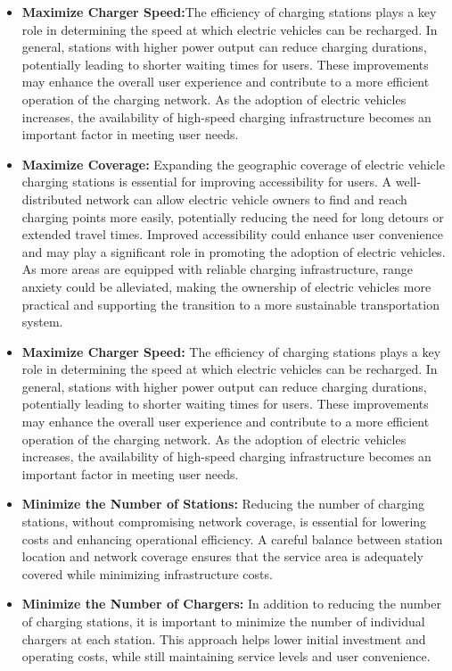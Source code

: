 \begin{itemize}
    \item \textbf{Maximize Charger Speed:}The efficiency of charging stations plays a key role in determining the speed at which electric vehicles can be recharged. In general, stations with higher power output can reduce charging durations, potentially leading to shorter waiting times for users. These improvements may enhance the overall user experience and contribute to a more efficient operation of the charging network. As the adoption of electric vehicles increases, the availability of high-speed charging infrastructure becomes an important factor in meeting user needs.
    
    \item \textbf{Maximize Coverage:} Expanding the geographic coverage of electric vehicle charging stations is essential for improving accessibility for users. A well-distributed network can allow electric vehicle owners to find and reach charging points more easily, potentially reducing the need for long detours or extended travel times. Improved accessibility could enhance user convenience and may play a significant role in promoting the adoption of electric vehicles. As more areas are equipped with reliable charging infrastructure, range anxiety could be alleviated, making the ownership of electric vehicles more practical and supporting the transition to a more sustainable transportation system.


    
    \item \textbf{Maximize Charger Speed:} The efficiency of charging stations plays a key role in determining the speed at which electric vehicles can be recharged. In general, stations with higher power output can reduce charging durations, potentially leading to shorter waiting times for users. These improvements may enhance the overall user experience and contribute to a more efficient operation of the charging network. As the adoption of electric vehicles increases, the availability of high-speed charging infrastructure becomes an important factor in meeting user needs.
    
    \item \textbf{Minimize the Number of Stations:} Reducing the number of charging stations, without compromising network coverage, is essential for lowering costs and enhancing operational efficiency. A careful balance between station location and network coverage ensures that the service area is adequately covered while minimizing infrastructure costs.
    
    \item \textbf{Minimize the Number of Chargers:} In addition to reducing the number of charging stations, it is important to minimize the number of individual chargers at each station. This approach helps lower initial investment and operating costs, while still maintaining service levels and user convenience.    

\end{itemize}

